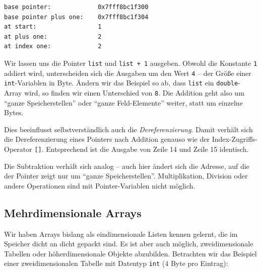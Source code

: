 \begin{cmdbox}
\begin{verbatim}
base pointer:             0x7fff8bc1f300
base pointer plus one:    0x7fff8bc1f304
at start:                 1
at plus one:              2
at index one:             2
\end{verbatim}
\end{cmdbox}

Wir lassen uns die Pointer \texttt{list} und \texttt{list + 1} ausgeben. Obwohl die Konstante \texttt{1} addiert wird, unterscheiden sich die Ausgaben um den Wert \texttt{4} -- der Größe einer \texttt{int}-Variablen in Byte. Ändern wir das Beispiel so ab, dass \texttt{list} ein \texttt{double}-Array wird, so finden wir einen Unterschied von \texttt{8}. Die Addition geht also um \enquote{ganze Speicherstellen} oder \enquote{ganze Feld-Elemente} weiter, statt um einzelne Bytes.

Dies beeinflusst selbstverständlich auch die \emph{Dereferenzierung}. Damit verhält sich die Dereferenzierung eines Pointers nach Addition genauso wie der Index-Zugriffs-Operator \texttt{[]}. Entsprechend ist die Ausgabe von Zeile 14 und Zeile 15 identisch.

Die Subtraktion verhält sich analog -- auch hier ändert sich die Adresse, auf die der Pointer zeigt nur um \enquote{ganze Speicherstellen}. Multiplikation, Division oder andere Operationen sind mit Pointer-Variablen nicht möglich.

\subsection{Mehrdimensionale Arrays} \label{sec:MultiDimArray}
Wir haben Arrays bislang als eindimensionale Listen kennen gelernt, die im Speicher dicht an dicht gepackt sind. Es ist aber auch möglich, zweidimensionale Tabellen oder höherdimensionale Objekte abzubilden. Betrachten wir das Beispiel einer zweidimensionalen Tabelle mit Datentyp \texttt{int} (4 Byte pro Eintrag):

